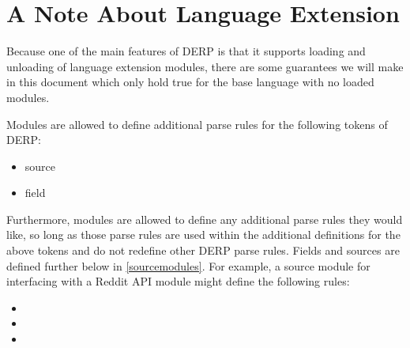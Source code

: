 \section{A Note About Language Extension}
Because one of the main features of DERP is that it supports loading and unloading
of language extension modules, there are some guarantees we will make in this document
which only hold true for the base language with no loaded modules.

Modules are allowed to define additional parse rules for the following tokens of DERP:
\begin{itemize}
\item source
\item field
\end{itemize}
Furthermore, modules are allowed to define any additional parse rules they would like, so
long as those parse rules are used within the additional definitions for the above tokens
and do not redefine other DERP parse rules. Fields and sources are defined further below in \ref{sourcemodules}.
For example, a source module for interfacing with a Reddit API module might define the following rules:

\begin{itemize}[leftmargin=1in]
    \item[\nonterminal{source}] \bnf{:}   \bnf{|} 
    \item[\nonterminal{field}]\bnf{:}  \bnf{|}  \bnf{|}  \bnf{|}  
    \item[\nonterminal{nsfw}] \bnf{:}  \bnf{|} 
\end{itemize}
